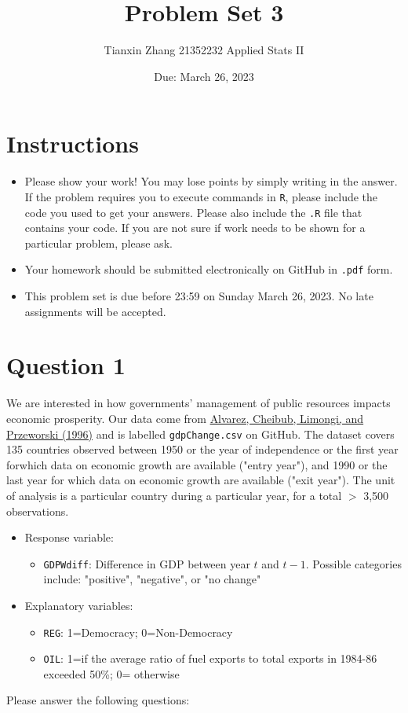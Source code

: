 \documentclass[12pt,letterpaper]{article}
\title{Problem Set 3}
\date{Due: March 26, 2023}
\author{Tianxin Zhang 21352232 Applied Stats II}
\begin{document}
	\maketitle
	\section*{Instructions}
	\begin{itemize}
	\item Please show your work! You may lose points by simply writing in the answer. If the problem requires you to execute commands in \texttt{R}, please include the code you used to get your answers. Please also include the \texttt{.R} file that contains your code. If you are not sure if work needs to be shown for a particular problem, please ask.
\item Your homework should be submitted electronically on GitHub in \texttt{.pdf} form.
\item This problem set is due before 23:59 on Sunday March 26, 2023. No late assignments will be accepted.
	\end{itemize}

	\vspace{.25cm}
\section*{Question 1}
\vspace{.25cm}
\noindent We are interested in how governments' management of public resources impacts economic prosperity. Our data come from \href{https://www.researchgate.net/profile/Adam_Przeworski/publication/240357392_Classifying_Political_Regimes/links/0deec532194849aefa000000/Classifying-Political-Regimes.pdf}{Alvarez, Cheibub, Limongi, and Przeworski (1996)} and is labelled \texttt{gdpChange.csv} on GitHub. The dataset covers 135 countries observed between 1950 or the year of independence or the first year forwhich data on economic growth are available ("entry year"), and 1990 or the last year for which data on economic growth are available ("exit year"). The unit of analysis is a particular country during a particular year, for a total $>$ 3,500 observations. 

\begin{itemize}
	\item
	Response variable: 
	\begin{itemize}
		\item \texttt{GDPWdiff}: Difference in GDP between year $t$ and $t-1$. Possible categories include: "positive", "negative", or "no change"
	\end{itemize}
	\item
	Explanatory variables: 
	\begin{itemize}
		\item
		\texttt{REG}: 1=Democracy; 0=Non-Democracy
		\item
		\texttt{OIL}: 1=if the average ratio of fuel exports to total exports in 1984-86 exceeded 50\%; 0= otherwise
	\end{itemize}
	
\end{itemize}
\newpage
\noindent Please answer the following questions:
\end{document}
